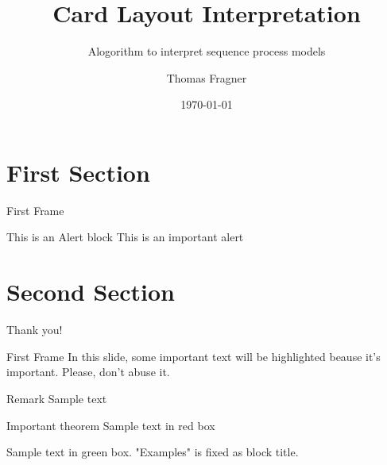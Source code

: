 \documentclass{beamer}
\title{Card Layout Interpretation}
\subtitle{Alogorithm to interpret sequence process models}
\date{\today}
\author{Thomas Fragner}
\institute{Centre for Modern Beamer Themes}
\begin{document}
  \maketitle
  \section{First Section}
  \begin{frame}{First Frame}
    \begin{alertblock}{This is an Alert block}
     This is an important alert
     \end{alertblock}
  \end{frame}
  \section{Second Section}
  \begin{frame}[standout]
  Thank you! \end{frame}
  \begin{frame}{First Frame}
	  In this slide, some important text will be
	  \alert{highlighted} beause it's important.
	  Please, don't abuse it.
 
	  \begin{block}{Remark}
	  Sample text
	  \end{block}
 
	  \begin{alertblock}{Important theorem}
	  Sample text in red box
	  \end{alertblock}
 
	  \begin{examples}
	  Sample text in green box. "Examples" is fixed as block title.
	  \end{examples}
  \end{frame}
\end{document}
